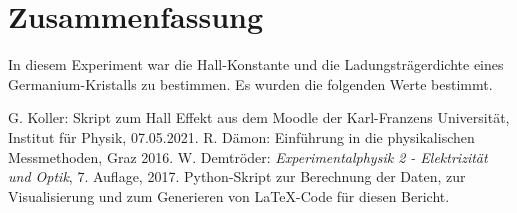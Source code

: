 \documentclass{article}
\begin{document}
\section{Zusammenfassung}

In diesem Experiment war die Hall-Konstante und die Ladungsträgerdichte eines Germanium-Kristalls zu bestimmen. Es wurden die folgenden Werte bestimmt.




\begin{thebibliography}{9}
 G. Koller: Skript zum Hall Effekt aus dem Moodle der Karl-Franzens Universität, Institut für Physik, 07.05.2021.
  R. Dämon: Einführung in die physikalischen Messmethoden, Graz 2016.
 W. Demtröder: \emph{Experimentalphysik 2 - Elektrizität  und Optik}, 7. Auflage, 2017.
 Python-Skript zur Berechnung der Daten, zur Visualisierung und zum Generieren von \LaTeX-Code für diesen Bericht.
\end{thebibliography}


\newpage 




%

%
\end{document}
